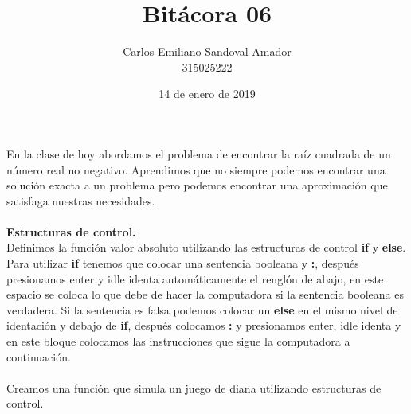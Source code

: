 \documentclass[letterpaper, 12pt, oneside]{article}%
\title{Bitácora 06}
\author{Carlos Emiliano Sandoval Amador \\ 315025222}
\date{14 de enero de 2019}
\begin{document}
	\maketitle
	En la clase de hoy abordamos el problema de encontrar la raíz cuadrada de un número real no negativo. Aprendimos que no siempre podemos encontrar una solución exacta a un problema pero podemos encontrar una aproximación que satisfaga nuestras necesidades. \\ \\\textbf{Estructuras de control.} \\ Definimos la función valor absoluto utilizando las estructuras de control \textbf{if} y \textbf{else}. Para utilizar \textbf{if} tenemos que colocar una sentencia booleana y \textbf{:}, después presionamos enter y idle identa automáticamente el renglón de abajo, en este espacio se coloca lo que debe de hacer la computadora si la sentencia booleana es verdadera. Si la sentencia es falsa podemos colocar un \textbf{else} en el mismo nivel de identación y debajo de \textbf{if}, después colocamos \textbf{:} y presionamos enter, idle identa y en este bloque colocamos las instrucciones que sigue la computadora a continuación. \\ \\ Creamos una función que simula un juego de diana utilizando estructuras de control.
\end{document}
